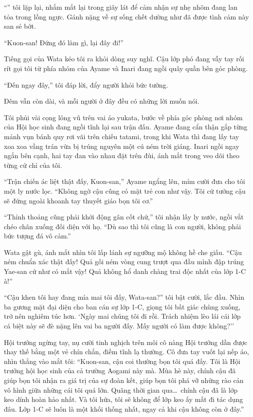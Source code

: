 \documentclass[../main.tex]{subfiles}
\begin{document}
``'' tôi lặp lại, nhắm mắt lại trong giây lát để cảm nhận sự nhẹ nhõm đang lan tỏa trong lồng ngực. Gánh nặng về sự sống chết dường như đã được tình cảm này san sẻ bớt.

``Kuon-san! Đứng đó làm gì, lại đây đi!''

Tiếng gọi của Wata kéo tôi ra khỏi dòng suy nghĩ. Cậu lớp phó đang vẫy tay rối rít gọi tôi từ phía nhóm của Ayame và Inari đang ngồi quây quần bên góc phòng.

``Đến ngay đây,'' tôi đáp lời, đẩy người khỏi bức tường.

Đêm vẫn còn dài, và mỗi người ở đây đều có những lời muốn nói.

Tôi phủi vài cọng lông vũ trên vai áo yukata, bước về phía góc phòng nơi nhóm của Hội học sinh đang ngồi tĩnh lại sau trận đấu. Ayame đang cẩn thận gắp từng mảnh vụn bánh quy rơi vãi trên chiếu tatami, trong khi Wata thì đang lấy tay xoa xoa vầng trán vừa bị trúng nguyên một cú ném trời giáng. Inari ngồi ngay ngắn bên cạnh, hai tay đan vào nhau đặt trên đùi, ánh mắt trong veo dõi theo từng cử chỉ của tôi.

``Trận chiến ác liệt thật đấy, Kuon-san,'' Ayame ngẩng lên, mỉm cười đưa cho tôi một ly nước lọc. ``Không ngờ cậu cũng có mặt trẻ con như vậy. Tôi cứ tưởng cậu sẽ đứng ngoài khoanh tay thuyết giáo bọn tôi cơ.''

``Thỉnh thoảng cũng phải khởi động gân cốt chứ,'' tôi nhận lấy ly nước, ngồi vắt chéo chân xuống đối diện với họ. ``Dù sao thì tôi cũng là con người, không phải bức tượng đá vô cảm.''

Wata gật gù, ánh mắt nhìn tôi lấp lánh sự ngưỡng mộ không hề che giấu. ``Cậu ném chuẩn xác thật đấy! Quả gối ném vòng cung trượt qua đầu mình đập trúng Yae-san cứ như có mắt vậy! Quả không hổ danh chàng trai độc nhất của lớp 1-C à!''

``Cậu khen tôi hay đang mỉa mai tôi đấy, Wata-san?'' tôi bật cười, lắc đầu. Nhìn ba gương mặt đại diện cho ban cán sự lớp 1-C, giọng tôi bất giác chùng xuống, trở nên nghiêm túc hơn. `Ngày mai chúng tôi đi rồi. Trách nhiệm lèo lái cái lớp cá biệt này sẽ đè nặng lên vai ba người đấy. Mấy người có làm được không?''

Hội trưởng ngừng tay, nụ cười tinh nghịch trên môi cô nàng Hội trưởng dần được thay thế bằng một vẻ chín chắn, điềm tĩnh lạ thường. Cô đưa tay vuốt lại nếp áo, nhìn thẳng vào mắt tôi: ``Kuon-san, cậu coi thường bọn tôi quá đấy. Tôi là Hội trưởng hội học sinh của cả trường Aogami này mà. Mùa hè này, chính cậu đã giúp bọn tôi nhận ra giá trị của sự đoàn kết, giúp bọn tôi phá vỡ những rào cản vô hình giữa những cái tôi quá lớn. Quãng thời gian qua\dots\ chính cậu đã là lớp keo dính hoàn hảo nhất. Và tôi hứa, tôi sẽ không để lớp keo ấy mất đi tác dụng đâu. Lớp 1-C sẽ luôn là một khối thống nhất, ngay cả khi cậu không còn ở đây.''
\end{document}
